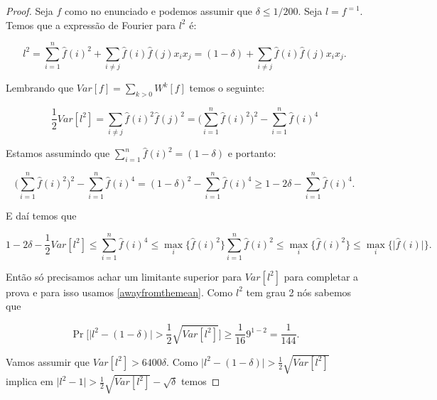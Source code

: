 \begin{proof}

Seja $f$ como no enunciado e podemos assumir que $\delta \leq 1/200$. Seja $l = f^{=1}$. Temos que a expressão de Fourier para $l^{2}$ é:

\begin{equation*}
	l^{2} = \sum_{i = 1}^{n}\widehat{f}(i)^{2} + \sum_{i \neq j}\widehat{f}(i)\widehat{f}(j)x_{i}x_{j} = (1 - \delta) + \sum_{i \neq j}\widehat{f}(i)\widehat{f}(j)x_{i}x_{j}.
\end{equation*}

Lembrando que $Var[f] = \sum_{k > 0}W^{k}[f]$ temos o seguinte:

\begin{equation*}
	\frac{1}{2}Var[l^{2}] = \sum_{i \neq j}\widehat{f}(i)^{2}\widehat{f}(j)^{2} = \Bigg(\sum_{i = 1}^{n}\widehat{f}(i)^{2}  \Bigg)^{2} - \sum_{i = 1}^{n}\widehat{f}(i)^{4}
\end{equation*}

Estamos assumindo que $\sum_{i = 1}^{n}\widehat{f}(i)^{2} = (1 - \delta)$ e portanto:

\begin{equation*}
	\Bigg(\sum_{i = 1}^{n}\widehat{f}(i)^{2}  \Bigg)^{2} - \sum_{i = 1}^{n}\widehat{f}(i)^{4} = (1 - \delta)^{2} - \sum_{i = 1}^{n}\widehat{f}(i)^{4} \geq 1 - 2\delta - \sum_{i = 1}^{n}\widehat{f}(i)^{4}.
\end{equation*}

E daí temos que

\begin{equation*}
	1 - 2\delta - \frac{1}{2}Var[l^{2}] \leq \sum_{i = 1}^{n}\widehat{f}(i)^{4} \leq \max_{i}\{ \widehat{f}(i)^{2} \}\sum_{i = 1}^{n}\widehat{f}(i)^{2} \leq \max_{i}\{\widehat{f}(i)^{2} \} \leq \max_{i}\{ \lvert \widehat{f}(i) \rvert \}.
\end{equation*}

Então só precisamos achar um limitante superior para $Var[l^{2}]$ para completar a prova e para isso usamos \ref{awayfromthemean}. Como $l^{2}$ tem grau 2 nós sabemos que

\begin{equation*}
	\Pr\Big[\lvert l^{2} - (1 - \delta) \rvert > \frac{1}{2}\sqrt{Var[l^{2}]}\Big] \geq \frac{1}{16}9^{1 - 2} = \frac{1}{144}.
\end{equation*}

Vamos assumir que $Var[l^{2}] > 6400\delta$. Como $\lvert l^{2} - (1 - \delta) \rvert > \frac{1}{2}\sqrt{Var[l^{2}]}$ implica em $\lvert l^{2} - 1 \rvert > \frac{1}{2}\sqrt{Var[l^{2}]} - \sqrt{\delta}$ temos


\end{proof}
